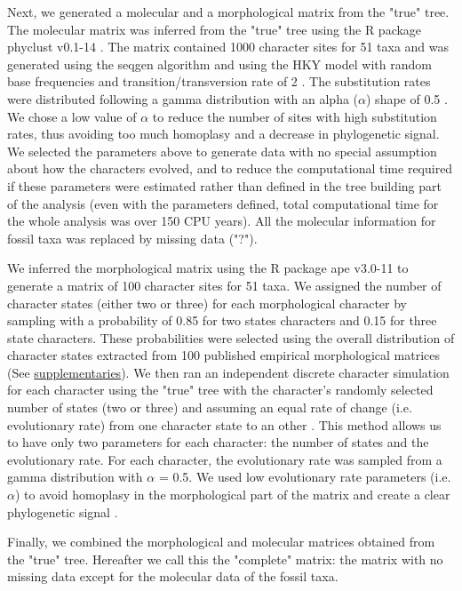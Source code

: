 \documentclass[12pt,letterpaper]{article}
\begin{document}
Next, we generated a molecular and a morphological matrix from the "true" tree. The molecular matrix was inferred from the "true" tree using the R package phyclust v0.1-14 \citep{chen2011}. The matrix contained 1000 character sites for 51 taxa and was generated using the seqgen algorithm \citep{ranbaut1997seqgen} and using the HKY model \citep{HKY85} with random base frequencies and transition/transversion rate of 2 \citep{douadycomparison2003}. The substitution rates were distributed following a gamma distribution with an alpha ($\alpha$) shape of 0.5 \citep{yangamong-site1996}. We chose a low value of $\alpha$ to reduce the number of sites with high substitution rates, thus avoiding too much homoplasy and a decrease in phylogenetic signal. We selected the parameters above to generate data with no special assumption about how the characters evolved, and to reduce the computational time required if these parameters were estimated rather than defined in the tree building part of the analysis (even with the parameters defined, total computational time for the whole analysis was over 150 CPU years). All the molecular information for fossil taxa was replaced by missing data ("?").

We inferred the morphological matrix using the R package ape v3.0-11 \citep{paradisape:2004} to generate a matrix of 100 character sites for 51 taxa. We assigned the number of character states (either two or three) for each morphological character by sampling with a probability of 0.85 for two states characters and 0.15 for three state characters. These probabilities were selected using the overall distribution of character states extracted from 100 published empirical morphological matrices (See \hyperref[supplementaries]{supplementaries}). We then ran an independent discrete character simulation for each character using the "true" tree with the character's randomly selected number of states (two or three) and assuming an equal rate of change (i.e. evolutionary rate) from one character state to an other \citep{Pagel22011994}. This method allows us to have only two parameters for each character: the number of states and the evolutionary rate. For each character, the evolutionary rate was sampled from a gamma distribution with $\alpha$ = 0.5. We used low evolutionary rate parameters (i.e. $\alpha$) to avoid homoplasy in the morphological part of the matrix and create a clear phylogenetic signal \citep{wagner2000,davalosintegrating2014}.

Finally, we combined the morphological and molecular matrices obtained from the "true" tree. Hereafter we call this the "complete" matrix: the matrix with no missing data except for the molecular data of the fossil taxa.
\end{document}
